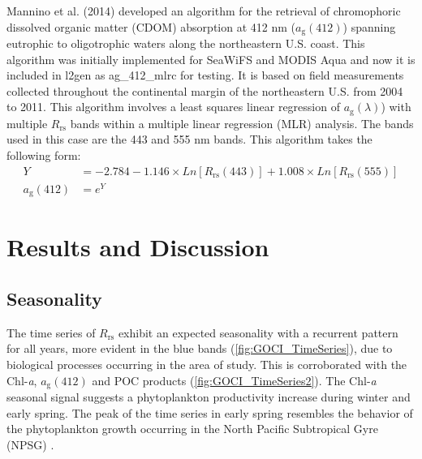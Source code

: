 \documentclass[remotesensing,article,submit,moreauthors,pdftex,10pt,a4paper]{Definitions/mdpi}
\begin{document}
Mannino et al. (2014) \cite{Mannino2014} developed an algorithm for the retrieval of chromophoric dissolved organic matter (CDOM) absorption at 412 nm ($a_\text{g}(412)$) spanning eutrophic to oligotrophic waters along the northeastern U.S. coast. This algorithm was initially implemented for SeaWiFS and MODIS Aqua and now it is included in l2gen as ag\_412\_mlrc for testing. It is based on field measurements collected throughout the continental margin of the northeastern U.S. from 2004 to 2011. This algorithm involves a least squares linear regression of $a_\text{g}(\lambda)$) with multiple $R_\text{rs}$ bands within a multiple linear regression (MLR) analysis. The bands used in this case are the 443 and 555 nm bands. This algorithm takes the following form: 
\begin{equation}
\begin{split}
  Y &= -2.784 -1.146\times Ln[R_\text{rs}(443)] + 1.008\times Ln[R_\text{rs}(555)] \\
  a_\text{g}(412) &= e^Y
\end{split}
\end{equation}

\section{Results and Discussion}
\label{sec:Results}
\subsection{Seasonality}\label{subsec:timeseries}
The time series of $R_\text{rs}$ exhibit an expected seasonality with a recurrent pattern for all years, more evident in the blue bands (\autoref{fig:GOCI_TimeSeries}), due to biological processes occurring in the area of study. This is corroborated with the Chl-{\it a}, $a_\text{g}(412)$ and POC products (\autoref{fig:GOCI_TimeSeries2}). The Chl-{\it a} seasonal signal suggests a phytoplankton productivity increase during winter and early spring. The peak of the time series in early spring resembles the behavior of the phytoplankton growth occurring in the North Pacific Subtropical Gyre (NPSG) \cite{Signorini_2015}.
\end{document}
